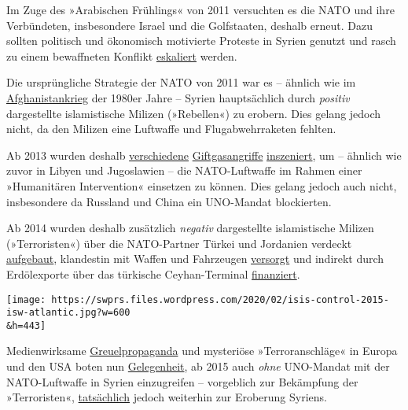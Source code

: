 Im Zuge des »Arabischen Frühlings« von 2011 versuchten es die NATO und
ihre Verbündeten, insbesondere Israel und die Golfstaaten, deshalb
erneut. Dazu sollten politisch und ökonomisch motivierte Proteste in
Syrien genutzt und rasch zu einem bewaffneten Konflikt
\href{https://www.globalresearch.ca/the-dirty-war-on-syria/5491859}{eskaliert}
werden.

Die ursprüngliche Strategie der NATO von 2011 war es -- ähnlich wie im
\href{https://en.wikipedia.org/wiki/Operation_Cyclone}{Afghanistankrieg}
der 1980er Jahre -- Syrien hauptsächlich durch \emph{positiv}
dargestellte islamistische Milizen (»Rebellen«) zu erobern. Dies gelang
jedoch nicht, da den Milizen eine Luftwaffe und Flugabwehrraketen
fehlten.

Ab 2013 wurden deshalb
\href{https://www.theamericanconservative.com/articles/ex-weapons-inspector-trumps-sarin-claims-built-on-lie/}{verschiedene}
\href{https://www.globalresearch.ca/the-bbc-saving-syrias-children-documentary-staged-events-fake-video-footage/5470158}{Giftgasangriffe}
\href{https://www.dailymail.co.uk/news/article-7793253/PETER-HITCHENS-reveals-evidence-watchdog-suppressed-report-casting-doubt-Assad-gas-attack.html}{inszeniert},
um -- ähnlich wie zuvor in Libyen und Jugoslawien -- die NATO-Luftwaffe
im Rahmen einer »Humanitären Intervention« einsetzen zu können. Dies
gelang jedoch auch nicht, insbesondere da Russland und China ein
UNO-Mandat blockierten.

Ab 2014 wurden deshalb zusätzlich \emph{negativ} dargestellte
islamistische Milizen (»Terroristen«) über die NATO-Partner Türkei und
Jordanien verdeckt
\href{https://www.globalresearch.ca/logistics-101-where-does-isis-get-its-guns/5454726}{aufgebaut},
klandestin mit Waffen und Fahrzeugen
\href{https://www.aljazeera.com/news/2017/12/isil-weapons-traced-saudi-arabia-171214164431586.html}{versorgt}
und indirekt durch Erdölexporte über das türkische Ceyhan-Terminal
\href{https://www.zerohedge.com/news/2015-11-27/how-turkey-exports-isis-oil-world-scientific-evidence}{finanziert}.

\texttt{[image: https://swprs.files.wordpress.com/2020/02/isis-control-2015-isw-atlantic.jpg?w=600\\\&h=443]}

Medienwirksame
\href{https://www.telegraph.co.uk/journalists/bill-gardner/11054488/Foley-murder-video-may-have-been-staged.html}{Greuelpropaganda}
und mysteriöse »Terroranschläge« in Europa und den USA boten nun
\href{https://www.mintpressnews.com/10-curious-facts-isis-media-ignores/236996/}{Gelegenheit},
ab 2015 auch \emph{ohne} UNO-Mandat mit der NATO-Luftwaffe in Syrien
einzugreifen -- vorgeblich zur Bekämpfung der »Terroristen«,
\href{https://mondoweiss.net/2017/01/watched-manage-leaked/}{tatsächlich}
jedoch weiterhin zur Eroberung Syriens.

